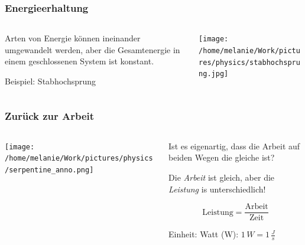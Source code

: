 \documentclass{beamer}
\begin{document}
\begin{frame}
\frametitle{Energieerhaltung}

\begin{columns}[c]

\begin{column}{5cm}
Arten von Energie können ineinander umgewandelt werden, aber die Gesamtenergie in einem geschlossenen System ist konstant. \\

\pause

Beispiel: Stabhochsprung

\end{column}

\begin{column}{5cm}
\begin{center}
\texttt{[image: /home/melanie/Work/pictures/physics/stabhochsprung.jpg]}
\end{center}
\end{column}

\end{columns}

\end{frame}



\begin{frame}
\frametitle{Zurück zur Arbeit}

 
\begin{columns}[c]

\begin{column}{5cm}

\begin{center}
\texttt{[image: /home/melanie/Work/pictures/physics/serpentine\_anno.png]}
\end{center}

\end{column}

\begin{column}{5cm}


Ist es eigenartig, dass die Arbeit auf beiden Wegen die gleiche ist? \pause

Die \emph{Arbeit} ist gleich, aber die \emph{Leistung} is unterschiedlich! 

\[
\text{Leistung} = \frac{\text{Arbeit}}{\text{Zeit}}
\]

Einheit: Watt (W): \(1\,W = 1\,\frac{J}{s}\)
\end{column}



\end{columns}

\end{frame}
\end{document}
